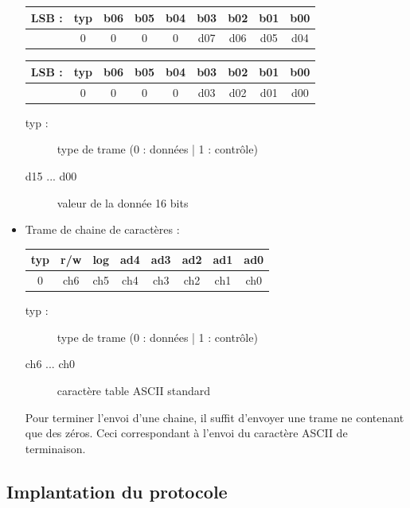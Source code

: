 \documentclass[11pt, french]{article} %
\begin{document}
\begin{itemize}
		\begin{tabular} {|c|c|c|c|c|c|c|c|c|}
			\hline
			\textbf{LSB : } & \textbf{typ} & \textbf{b06} & \textbf{b05} & \textbf{b04} & \textbf{b03} & \textbf{b02} & \textbf{b01} & \textbf{b00}\\
			\hline
			 & 0 & 0 &  0 &  0 &  d07 &  d06 &  d05&  d04 \\ \hline
		\end{tabular}

		\begin{tabular} {|c|c|c|c|c|c|c|c|c|}
			\hline
			\textbf{LSB : } & \textbf{typ} & \textbf{b06} & \textbf{b05} & \textbf{b04} & \textbf{b03} & \textbf{b02} & \textbf{b01} & \textbf{b00}\\
			\hline
			 & 0 & 0 &  0 &  0 &  d03 &  d02 &  d01 &  d00 \\ \hline
		\end{tabular}

		\begin{description}
			\item[typ :] type de trame (0 : données | 1 : contrôle)
			\item[d15 ... d00] valeur de la donnée 16 bits
		\end{description}

	\medskip
	\item Trame de chaine de caractères : \\

		\begin{tabular} {|c|c|c|c|c|c|c|c|}
			\hline
			\textbf{typ} & \textbf{r/w} & \textbf{log} & \textbf{ad4} & \textbf{ad3} & \textbf{ad2} & \textbf{ad1} & \textbf{ad0}\\
			\hline
			0 &  ch6 &  ch5 &  ch4 &  ch3 &  ch2 &  ch1 &  ch0 \\ \hline
		\end{tabular}

		\begin{description}
			\item[typ :] type de trame (0 : données | 1 : contrôle)
			\item[ch6 ... ch0] caractère table ASCII standard
		\end{description}

		Pour terminer l'envoi d'une chaine, il suffit d'envoyer une trame ne contenant que des zéros. Ceci correspondant à l'envoi du caractère ASCII de terminaison.

\end{itemize}

\subsection{Implantation du protocole}
\end{document}

